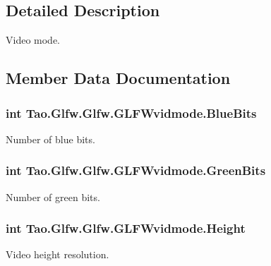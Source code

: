 \subsection{Detailed Description}
Video mode. 

\subsection{Member Data Documentation}
\hypertarget{struct_tao_1_1_glfw_1_1_glfw_1_1_g_l_f_wvidmode_a6482092dfb6f076554afbda69d139089}{
\subsubsection[{BlueBits}]{\setlength{\rightskip}{0pt plus 5cm}int {\bf Tao.Glfw.Glfw.GLFWvidmode.BlueBits}}}
\label{struct_tao_1_1_glfw_1_1_glfw_1_1_g_l_f_wvidmode_a6482092dfb6f076554afbda69d139089}


Number of blue bits. 

\hypertarget{struct_tao_1_1_glfw_1_1_glfw_1_1_g_l_f_wvidmode_a409d6bf153259847ca2f3ee30d2e4886}{
\subsubsection[{GreenBits}]{\setlength{\rightskip}{0pt plus 5cm}int {\bf Tao.Glfw.Glfw.GLFWvidmode.GreenBits}}}
\label{struct_tao_1_1_glfw_1_1_glfw_1_1_g_l_f_wvidmode_a409d6bf153259847ca2f3ee30d2e4886}


Number of green bits. 

\hypertarget{struct_tao_1_1_glfw_1_1_glfw_1_1_g_l_f_wvidmode_a2a0bbd1e7e025047b9b9a80f08d53891}{
\subsubsection[{Height}]{\setlength{\rightskip}{0pt plus 5cm}int {\bf Tao.Glfw.Glfw.GLFWvidmode.Height}}}
\label{struct_tao_1_1_glfw_1_1_glfw_1_1_g_l_f_wvidmode_a2a0bbd1e7e025047b9b9a80f08d53891}


Video height resolution. 

